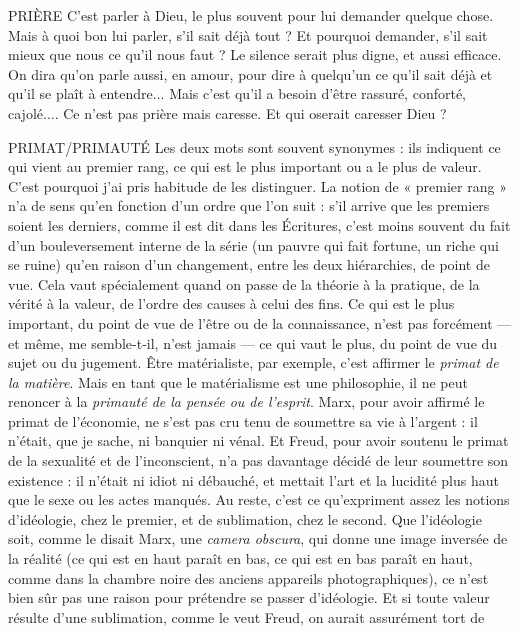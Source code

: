 PRIÈRE C’est parler à Dieu, le plus souvent pour lui demander quelque
chose. Mais à quoi bon lui parler, s’il sait déjà tout ? Et pourquoi
demander, s’il sait mieux que nous ce qu’il nous faut ? Le silence serait plus
digne, et aussi efficace.
On dira qu’on parle aussi, en amour, pour dire à quelqu'un ce qu’il sait
déjà et qu’il se plaît à entendre... Mais c’est qu’il a besoin d’être rassuré, conforté,
cajolé.... Ce n’est pas prière mais caresse. Et qui oserait caresser Dieu ?

PRIMAT/PRIMAUTÉ Les deux mots sont souvent synonymes : ils indiquent
ce qui vient au premier rang, ce qui est le plus
important ou a le plus de valeur. C’est pourquoi j'ai pris habitude de les distinguer.
La notion de « premier rang » n’a de sens qu’en fonction d’un ordre
que l’on suit : s’il arrive que les premiers soient les derniers, comme il est dit
dans les Écritures, c’est moins souvent du fait d’un bouleversement interne de
la série (un pauvre qui fait fortune, un riche qui se ruine) qu’en raison d’un
changement, entre les deux hiérarchies, de point de vue. Cela vaut spécialement
quand on passe de la théorie à la pratique, de la vérité à la valeur, de
l’ordre des causes à celui des fins. Ce qui est le plus important, du point de vue
de l’être ou de la connaissance, n’est pas forcément — et même, me semble-t-il,
n'est jamais — ce qui vaut le plus, du point de vue du sujet ou du jugement.
Être matérialiste, par exemple, c’est affirmer le {\it primat de la matière}. Mais en
tant que le matérialisme est une philosophie, il ne peut renoncer à la {\it primauté
de la pensée ou de l'esprit}. Marx, pour avoir affirmé le primat de l’économie, ne
s’est pas cru tenu de soumettre sa vie à l’argent : il n’était, que je sache, ni banquier
ni vénal. Et Freud, pour avoir soutenu le primat de la sexualité et de
l'inconscient, n’a pas davantage décidé de leur soumettre son existence : il
n'était ni idiot ni débauché, et mettait l’art et la lucidité plus haut que le sexe
ou les actes manqués. Au reste, c’est ce qu’expriment assez les notions d’idéologie,
chez le premier, et de sublimation, chez le second. Que l'idéologie soit,
comme le disait Marx, une {\it camera obscura}, qui donne une image inversée de la
réalité (ce qui est en haut paraît en bas, ce qui est en bas paraît en haut, comme
dans la chambre noire des anciens appareils photographiques), ce n’est bien sûr
pas une raison pour prétendre se passer d’idéologie. Et si toute valeur résulte
d’une sublimation, comme le veut Freud, on aurait assurément tort de
